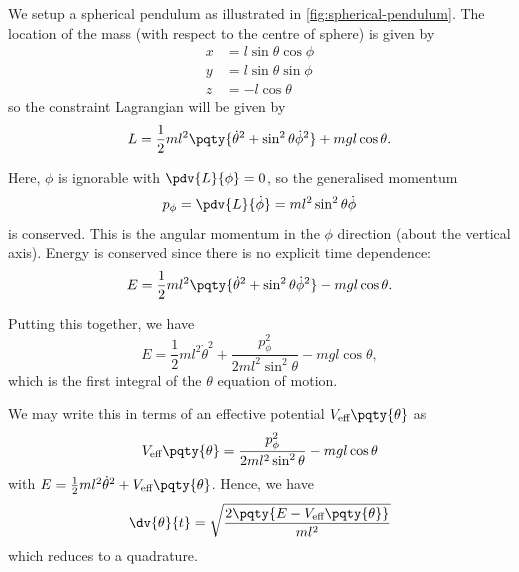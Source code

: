 \begin{example}
    We setup a spherical pendulum as illustrated in \autoref{fig:spherical-pendulum}. The location of the mass (with respect to the centre of sphere) is given by
    \begin{subequations}
        \begin{align}
            x &= l \sin \theta \cos \phi \\
            y &= l \sin \theta \sin \phi \\
            z &= - l \cos \theta
        \end{align}
    \end{subequations}
    so the constraint Lagrangian will be given by
    \begin{equation}
        L = \frac{1}{2} m l^2 \pqty{\dot{\theta}^2 + \sin^2 \theta \dot{\phi}^2} + m g l \cos \theta.
    \end{equation}

    Here, \(\phi\) is ignorable with \(\pdv{L}{\phi} = 0\), so the generalised momentum
    \begin{equation}
        p_\phi = \pdv{L}{\dot{\phi}} = m l^2 \sin^2 \theta \dot{\phi}
    \end{equation}
    is conserved. This is the angular momentum in the \(\phi\) direction (about the vertical axis). Energy is conserved since there is no explicit time dependence:
    \begin{equation}
        E = \frac{1}{2} m l^2 \pqty{\dot{\theta}^2 + \sin^2 \theta \dot{\phi}^2} - m g l \cos \theta.
    \end{equation}

    Putting this together, we have
    \begin{equation}
        E = \frac{1}{2} m l^2 \dot{\theta}^2 + \frac{p_\phi^2}{2 m l^2 \sin^2\theta} - m g l \cos \theta,
    \end{equation}
    which is the first integral of the \(\theta\) equation of motion.

    We may write this in terms of an effective potential \(V_{\text{eff}}\pqty{\theta}\) as
    \begin{equation}
        V_{\text{eff}} \pqty{\theta} = \frac{p_\phi^2}{2 m l^2 \sin^2 \theta} - m g l \cos \theta
    \end{equation}
    with \(E = \frac{1}{2} m l^2 \dot{\theta}^2 + V_{\text{eff}}\pqty{\theta}\). Hence, we have
    \begin{equation}
        \dv{\theta}{t} = \sqrt{\frac{2 \pqty{E - V_{\text{eff}}\pqty{\theta}}}{m l^2}}
    \end{equation}
    which reduces to a quadrature.


\end{example}
